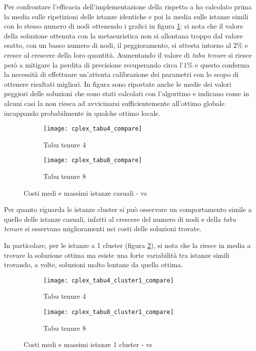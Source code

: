 Per confrontare l'efficacia dell'implementazione della \tabu rispetto a  ho calcolato prima la media sulle ripetizioni delle istanze identiche e poi la media sulle istanze simili con lo stesso numero di nodi ottenendo i grafici in figura \ref{fig:costi cplex tabu}: si nota che il valore della soluzione ottenuta con la metaeuristica non si allontana troppo dal valore esatto, con un basso numero di nodi, il peggioramento, si attesta intorno al $2\%$ e cresce al crescere della loro quantità.
Aumentando il valore di \emph{tabu tenure} si riesce però a mitigare la perdita di precisione recuperando circa l'$1\%$ e questo conferma la necessità di effettuare un'attenta calibrazione dei parametri con lo scopo di ottenere risultati migliori.
In figura sono riportate anche le medie dei valori peggiori delle soluzioni che sono stati calcolati con l'algoritmo e indicano come in alcuni casi la \tabu non riesca ad avvicinarsi sufficientemente all'ottimo globale incappando probabilmente in qualche ottimo locale.

\begin{figure}[H]
	\centering
	\begin{subfigure}[b]{.45\textwidth}
			\texttt{[image: cplex\_tabu4\_compare]}
			\caption{Tabu tenure 4}
	\end{subfigure}
	\quad
	\begin{subfigure}[b]{.45\textwidth}
			\texttt{[image: cplex\_tabu8\_compare]}
			\caption{Tabu tenure 8}
	\end{subfigure}
	\caption{Costi medi e massimi istanze casuali -  vs \tabu}
	\label{fig:costi cplex tabu}
\end{figure}

Per quanto riguarda le istanze cluster si può osservare un comportamento simile a quello delle istanze casuali, infatti al crescere del numero di nodi e della \emph{tabu tenure} si osservano miglioramenti nei costi delle soluzioni trovate.

In particolare, per le istanze a 1 cluster (figura \ref{fig:costi cplex tabu cluster 1}), si nota che la \tabu riesce in media a trovare la soluzione ottima ma esiste una forte variabilità tra istanze simili trovando, a volte, soluzioni molto lontane da quella ottima.

\begin{figure}[H]
	\centering
	\begin{subfigure}[b]{.45\textwidth}
			\texttt{[image: cplex\_tabu4\_cluster1\_compare]}
			\caption{Tabu tenure 4}
	\end{subfigure}
	\quad
	\begin{subfigure}[b]{.45\textwidth}
			\texttt{[image: cplex\_tabu8\_cluster1\_compare]}
			\caption{Tabu tenure 8}
	\end{subfigure}
	\caption{Costi medi e massimi istanze 1 cluster -  vs \tabu}
	\label{fig:costi cplex tabu cluster 1}
\end{figure}

